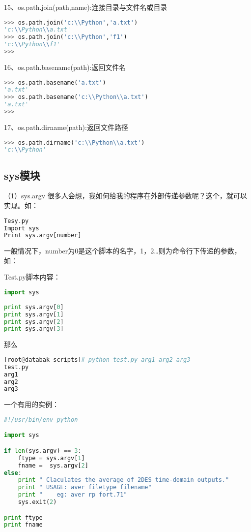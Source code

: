 15、os.path.join(path,name):连接目录与文件名或目录
\begin{lstlisting}[language=Python]
>>> os.path.join('c:\\Python','a.txt')
'c:\\Python\\a.txt'
>>> os.path.join('c:\\Python','f1')
'c:\\Python\\f1'
>>> 
\end{lstlisting}

16、os.path.basename(path):返回文件名
\begin{lstlisting}[language=Python]
>>> os.path.basename('a.txt')
'a.txt'
>>> os.path.basename('c:\\Python\\a.txt')
'a.txt'
>>> 
\end{lstlisting}

17、os.path.dirname(path):返回文件路径
\begin{lstlisting}[language=Python]
>>> os.path.dirname('c:\\Python\\a.txt')
'c:\\Python'
\end{lstlisting}



\subsection{sys模块}
（1）sys.argv
很多人会想，我如何给我的程序在外部传递参数呢？这个，就可以实现。如：
\begin{lstlisting}[language=Python]
Tesy.py
Import sys
Print sys.argv[number]
\end{lstlisting}
一般情况下，number为0是这个脚本的名字，1，2…则为命令行下传递的参数，如：

Test.py脚本内容：
\begin{lstlisting}[language=Python]
import sys
 
print sys.argv[0]
print sys.argv[1]
print sys.argv[2]
print sys.argv[3]
\end{lstlisting}
那么
\begin{lstlisting}[language=Python]
[root@databak scripts]# python test.py arg1 arg2 arg3
test.py
arg1
arg2
arg3
\end{lstlisting}

一个有用的实例：
\begin{lstlisting}[language=Python]
#!/usr/bin/env python

import sys

if len(sys.argv) == 3:
	ftype = sys.argv[1]
	fname =  sys.argv[2]
else:
	print " Claculates the average of 2DES time-domain outputs."
	print " USAGE: aver filetype filename"
	print "    eg: aver rp fort.71"
	sys.exit(2)

print ftype
print fname
\end{lstlisting}


